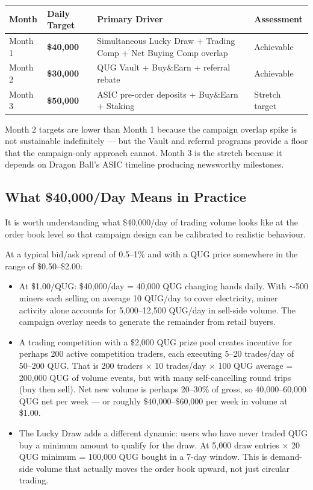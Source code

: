 \documentclass[11pt,a4paper]{article}
\begin{document}
\begin{center}
\begin{tabular}{C{2cm} C{3cm} L{5cm} C{2cm}}
  \toprule
  \textbf{Month} & \textbf{Daily Target} & \textbf{Primary Driver} & \textbf{Assessment} \\
  \midrule
  Month 1 & \textbf{\$40,000} & Simultaneous Lucky Draw + Trading Comp + Net Buying Comp overlap & Achievable \\
  Month 2 & \textbf{\$30,000} & QUG Vault + Buy\&Earn + referral rebate & Achievable \\
  Month 3 & \textbf{\$50,000} & ASIC pre-order deposits + Buy\&Earn + Staking & Stretch target \\
  \bottomrule
\end{tabular}
\end{center}

Month 2 targets are lower than Month 1 because the campaign overlap spike is not sustainable indefinitely — but the Vault and referral programs provide a floor that the campaign-only approach cannot. Month 3 is the stretch because it depends on Dragon Ball's ASIC timeline producing newsworthy milestones.

\subsection{What \$40,000/Day Means in Practice}

It is worth understanding what \$40,000/day of trading volume looks like at the order book level so that campaign design can be calibrated to realistic behaviour.

At a typical bid/ask spread of 0.5--1\% and with a QUG price somewhere in the range of \$0.50--\$2.00:

\begin{itemize}[leftmargin=1.5em]
  \item At \$1.00/QUG: \$40,000/day = 40,000 QUG changing hands daily. With $\sim$500 miners each selling on average 10 QUG/day to cover electricity, miner activity alone accounts for 5,000--12,500 QUG/day in sell-side volume. The campaign overlay needs to generate the remainder from retail buyers.

  \item A trading competition with a \$2,000 QUG prize pool creates incentive for perhaps 200 active competition traders, each executing 5--20 trades/day of 50--200 QUG. That is 200 traders $\times$ 10 trades/day $\times$ 100 QUG average = 200,000 QUG of volume events, but with many self-cancelling round trips (buy then sell). Net new volume is perhaps 20--30\% of gross, so 40,000--60,000 QUG net per week — or roughly \$40,000--\$60,000 per week in volume at \$1.00.

  \item The Lucky Draw adds a different dynamic: users who have never traded QUG buy a minimum amount to qualify for the draw. At 5,000 draw entries $\times$ 20 QUG minimum = 100,000 QUG bought in a 7-day window. This is demand-side volume that actually moves the order book upward, not just circular trading.
\end{itemize}
\end{document}
